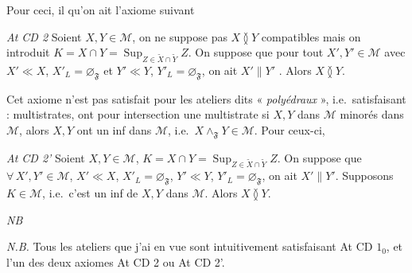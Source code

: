 \documentclass[11pt,a4paper]{article}
\begin{document}
Pour ceci, il   qu'on ait l'axiome suivant

\emph{At CD 2} \quad Soient $X, Y \in \mathcal{M}$,  on ne suppose pas $X \between Y$ compatibles mais on introduit $K = X \cap Y = \mathop{\mathrm{Sup}}_{Z \in \widetilde{X} \cap \widetilde{Y}} Z$. On suppose que pour tout $X', Y' \in \mathcal{M}$ avec $X' \ll X$, $X'_{L} = \varnothing_{\mathfrak{F}}$ et $Y' \ll Y$, $Y'_{L} = \varnothing_{\mathfrak{F}}$, on ait $X' \parallel Y'$ \struck{\ill{}}. Alors $X \between Y$.


Cet axiome n'est pas satisfait  pour les ateliers dits « \emph{polyédraux} », i.e.\ satisfaisant :   multistrates,  \struck{\ill{}}  ont pour intersection une multistrate  si $X, Y$ \struck{\ill{}} dans $\mathcal{M}$   minorés dans $\mathcal{M}$, alors  $X, Y$ ont un inf dans $\mathcal{M}$, i.e.\ $X \wedge_{\mathfrak{F}} Y \in \mathcal{M}$. Pour ceux-ci,

\emph{At CD 2'} \quad Soient $X, Y \in \mathcal{M}$, $K = X \cap Y = \mathop{\mathrm{Sup}}_{Z \in \widetilde{X} \cap \widetilde{Y}} Z$. On suppose que $\forall\, X', Y' \in \mathcal{M}$, $X' \ll X$, $X'_{L} = \varnothing_{\mathfrak{F}}$, $Y' \ll Y$, $Y'_{L} = \varnothing_{\mathfrak{F}}$, on ait $X' \parallel Y'$.  Supposons  $K \in \mathcal{M}$, i.e.\ c'est un inf \struck{\ill{}} de $X, Y$ dans $\mathcal{M}$. Alors $X \between Y$.


\emph{NB} 

\emph{N.B.} \quad Tous les ateliers que j'ai en vue sont intuitivement satisfaisant At CD $1_{0}$, et l'un des deux axiomes At CD 2 ou At CD 2'.
\end{document}
